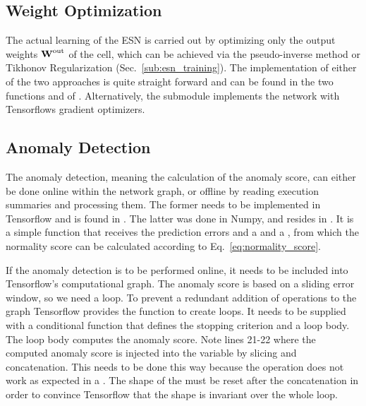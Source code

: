 \subsection{Weight Optimization}%
\label{sec:weight_optimization}

The actual learning of the ESN is carried out by optimizing only the output
weights $\boldsymbol{\textbf{W}}^{\text{out}}$ of the cell, which can be achieved via the pseudo-inverse
method or Tikhonov Regularization (Sec.~\ref{sub:esn_training}). The
implementation of either of the two approaches is quite straight forward
and can be found in the two functions  and 
of .
Alternatively, the  submodule implements the network
with Tensorflows gradient optimizers.\\

\subsection{Anomaly Detection}%
\label{sec:anomaly_detection_model}

The anomaly detection, meaning the calculation of the anomaly score, can either
be done online within the network graph, or offline by reading execution
summaries and processing them. The former needs to be implemented in Tensorflow
and is found in . The latter was done in Numpy, and
resides in .  It is a simple function that receives
the prediction errors and a  and a
, from which the normality score can be calculated
according to Eq.~\ref{eq:normality_score}.

If the anomaly detection is to be performed online, it needs to be
included into Tensorflow's computational graph.  The anomaly score is based on
a sliding error window, so we need a loop. To prevent a redundant addition of
operations to the graph Tensorflow provides the  function
to create loops. It needs to be supplied with a conditional function that
defines the stopping criterion and a loop body.  The loop body computes the
anomaly score. Note lines 21-22 where the computed anomaly score is injected
into the  variable by slicing and concatenation. This needs to be
done this way because the  operation does not work as expected
in a .  The shape of the  must be reset after
the concatenation in order to convince Tensorflow that the shape is invariant
over the whole loop.

